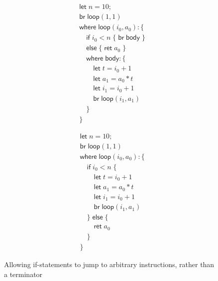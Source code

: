 \documentclass[acmsmall,screen,review]{acmart}
\newcommand{\ms}[1]{\ensuremath{\mathsf{#1}}}
\begin{document}
\begin{figure}
  \centering
  \begin{subfigure}[t]{.5\textwidth}
    \begin{align*}
      & \ms{let}\;n = 10; \\
      & \ms{br}\;\ms{loop}(1, 1) \\
      & \ms{where}\;\ms{loop}(i_0, a_0): \{ \\
      & \quad \ms{if}\;i_0 < n\;\{\;\ms{br}\;\ms{body}\;\} \\
      & \quad \ms{else}\;\{\;\ms{ret}\;a_0\;\} \\
      & \quad \ms{where}\;\ms{body}: \{\\ 
      & \qquad \ms{let}\;t = i_0 + 1 \\
      & \qquad \ms{let}\;a_1 = a_0 * t \\
      & \qquad \ms{let}\;i_1 = i_0 + 1 \\
      & \qquad \ms{br}\;\ms{loop}(i_1, a_1) \\
      & \quad \} \\
      & \}
    \end{align*}
  \end{subfigure}%
  \begin{subfigure}[t]{.5\textwidth}
    \begin{align*}
      & \ms{let}\;n = 10; \\
      & \ms{br}\;\ms{loop}(1, 1) \\
      & \ms{where}\;\ms{loop}(i_0, a_0): \{\\
      & \quad \ms{if}\;i_0 < n\;\{ \\
      & \qquad \ms{let}\;t = i_0 + 1 \\
      & \qquad \ms{let}\;a_1 = a_0 * t \\
      & \qquad \ms{let}\;i_1 = i_0 + 1 \\
      & \qquad \ms{br}\;\ms{loop}(i_1, a_1) \\
      & \quad \}\;\ms{else}\;\{ \\
      & \qquad \ms{ret}\;a_0 \\
      & \quad \} \\
      & \}
    \end{align*}
  \end{subfigure}
  \caption{Allowing if-statements to jump to arbitrary instructions, rather than a terminator}
  \Description{}
  \label{fig:bba-to-anf}
\end{figure}
\end{document}
